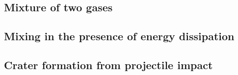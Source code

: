 

\subsection{Mixture of two gases}\label{sec:mix1}



\subsection{Mixing in the presence of energy dissipation}\label{sec:mix2}

\subsection{Crater formation from projectile impact}\label{sec:crater}




